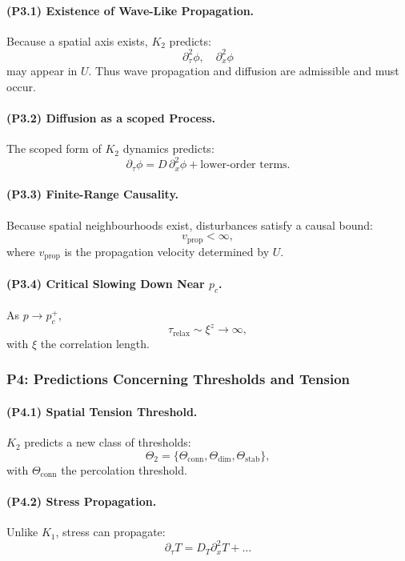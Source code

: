 \paragraph{(P3.1) Existence of Wave-Like Propagation.}
Because a spatial axis exists, $K_2$ predicts:
\[
\partial_\tau^2 \phi, \quad \partial_x^2 \phi
\]
may appear in $U$.
Thus wave propagation and diffusion are admissible and must occur.

\paragraph{(P3.2) Diffusion as a scoped Process.}
The scoped form of $K_2$ dynamics predicts:
\[
\partial_\tau \phi = D\, \partial_x^2\phi + \text{lower-order terms}.
\]

\paragraph{(P3.3) Finite-Range Causality.}
Because spatial neighbourhoods exist, disturbances satisfy a causal bound:
\[
v_{\mathrm{prop}} < \infty,
\]
where $v_{\mathrm{prop}}$ is the propagation velocity determined by $U$.

\paragraph{(P3.4) Critical Slowing Down Near \texorpdfstring{$p_c$}{p_c}.}
As $p \to p_c^+$,
\[
\tau_{\mathrm{relax}} \sim \xi^z \to \infty,
\]
with $\xi$ the correlation length.

\subsubsection{P4: Predictions Concerning Thresholds and Tension}

\paragraph{(P4.1) Spatial Tension Threshold.}
$K_2$ predicts a new class of thresholds:
\[
\Theta_2 = \{\Theta_{\mathrm{conn}}, \Theta_{\mathrm{dim}}, 
\Theta_{\mathrm{stab}}\},
\]
with $\Theta_{\mathrm{conn}}$ the percolation threshold.

\paragraph{(P4.2) Stress Propagation.}
Unlike $K_1$, stress can propagate:
\[
\partial_\tau T = D_T \partial_x^2 T + \ldots
\]


